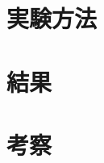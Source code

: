 \documentclass[11pt,a4paper]{jsarticle}
\begin{document}
\section{実験方法}

\section{結果}

\section{考察}
\end{document}
